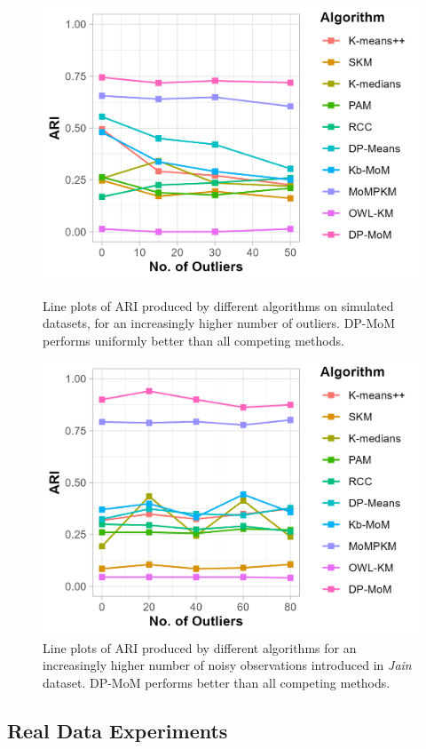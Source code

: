 \documentclass{article}
\begin{document}
\begin{figure}
\centering
\begin{minipage}{.46\textwidth}
  \centering
  \includegraphics[width=.75\linewidth]{Diagrams/plot-ari-sim-light-0.6.png}
    \caption{Line plots of ARI produced by different algorithms on simulated datasets, for an increasingly higher number of outliers. DP-MoM performs uniformly better than all competing methods.}
    \label{fig:plot-sim-ari}
\end{minipage}%
\hspace{5mm}
\begin{minipage}{.46\textwidth}
  \centering
  \includegraphics[width=.75\linewidth]{Diagrams/plot-ari-jain-light-0.6.png}
    \caption{Line plots of ARI produced by different algorithms for an increasingly higher number of noisy observations introduced in \textit{Jain} dataset. DP-MoM performs better than all competing methods.}
    \label{fig:plot-jain-ari}
\end{minipage}
\end{figure}

\subsection{Real Data Experiments}
\end{document}
